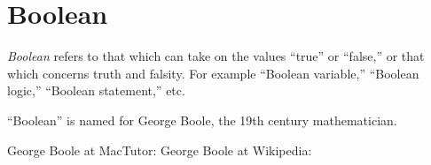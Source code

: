 \documentclass{article}
\begin{document}
\section{Boolean}

\emph{Boolean} refers to that which can take on the values ``true'' or ``false,'' or that which concerns truth and falsity.  For example ``Boolean variable,'' ``Boolean logic,'' ``Boolean statement,'' etc.

``Boolean'' is named for George Boole, the 19th century mathematician.

\begin{thebibliography}{3}
 George Boole at MacTutor: 
 George Boole at Wikipedia: 
\end{thebibliography}
\end{document}
